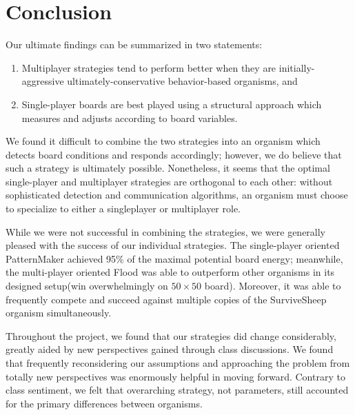 \section{Conclusion}
\label{sec:conclusion}
Our ultimate findings can be summarized in two statements:

\begin{enumerate}
\item Multiplayer strategies tend to perform better when they are initially-aggressive ultimately-conservative behavior-based organisms, and
\item Single-player boards are best played using a structural approach which measures and adjusts according to board variables.
\end{enumerate}

We found it difficult to combine the two strategies into an organism
which detects board conditions and responds accordingly; however, we
do believe that such a strategy is ultimately possible.  Nonetheless,
it seems that the optimal single-player and multiplayer strategies are
orthogonal to each other: without sophisticated detection and
communication algorithms, an organism must choose to specialize to
either a singleplayer or multiplayer role.

While we were not successful in combining the strategies, we were
generally pleased with the success of our individual strategies.  The
single-player oriented PatternMaker achieved 95\% of the maximal
potential board energy; meanwhile, the multi-player oriented Flood was
able to outperform other organisms in its designed setup(win
overwhelmingly on $50\times 50$ board). Moreover, it was able to
frequently compete and succeed against multiple copies of the
SurviveSheep organism simultaneously.

Throughout the project, we found that our strategies did change
considerably, greatly aided by new perspectives gained through class
discussions.  We found that frequently reconsidering our assumptions
and approaching the problem from totally new perspectives was
enormously helpful in moving forward.  Contrary to class sentiment, we
felt that overarching strategy, not parameters, still accounted for
the primary differences between organisms.
